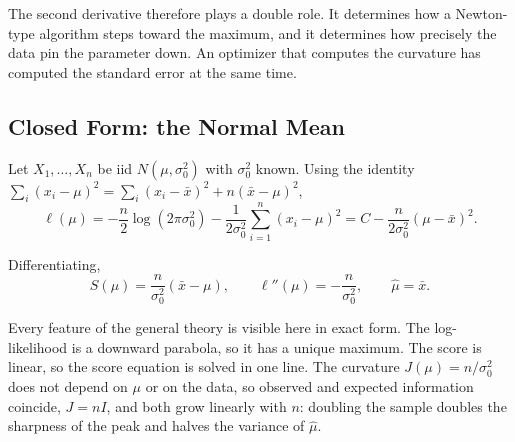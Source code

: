\documentclass[
  letterpaper,
  DIV=11,
  numbers=noendperiod]{scrreprt}
\begin{document}
The second derivative therefore plays a double role. It determines how a
Newton-type algorithm steps toward the maximum, and it determines how
precisely the data pin the parameter down. An optimizer that computes
the curvature has computed the standard error at the same time.

\subsection{Closed Form: the Normal
Mean}\label{closed-form-the-normal-mean}

Let \(X_1, \ldots, X_n\) be iid \(N(\mu, \sigma_0^{2})\) with
\(\sigma_0^{2}\) known. Using the identity
\(\sum_i (x_i - \mu)^2 = \sum_i (x_i - \bar x)^2 + n(\bar x - \mu)^2\),
\[\ell(\mu) = -\frac{n}{2}\log\left(2\pi\sigma_0^{2}\right) - \frac{1}{2\sigma_0^{2}}\sum_{i=1}^{n}(x_i - \mu)^{2} = C - \frac{n}{2\sigma_0^{2}}(\mu - \bar x)^{2} .\]

Differentiating,
\[S(\mu) = \frac{n}{\sigma_0^{2}}\left(\bar x - \mu\right), \qquad \ell''(\mu) = -\frac{n}{\sigma_0^{2}}, \qquad \hat\mu = \bar x .\]

Every feature of the general theory is visible here in exact form. The
log-likelihood is a downward parabola, so it has a unique maximum. The
score is linear, so the score equation is solved in one line. The
curvature \(J(\mu) = n/\sigma_0^{2}\) does not depend on \(\mu\) or on
the data, so observed and expected information coincide, \(J = nI\), and
both grow linearly with \(n\): doubling the sample doubles the sharpness
of the peak and halves the variance of \(\hat\mu\).
\end{document}
